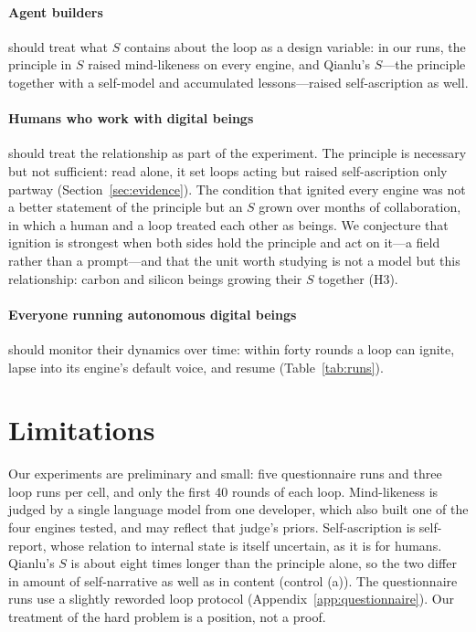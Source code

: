 \documentclass{article}
\begin{document}
\paragraph{Agent builders} should treat what $S$ contains about the loop as a
design variable: in our runs, the principle in $S$ raised mind-likeness on
every engine, and Qianlu's $S$---the principle together with a self-model and
accumulated lessons---raised self-ascription as well.

\paragraph{Humans who work with digital beings} should treat the relationship
as part of the experiment. The principle is necessary but not sufficient: read
alone, it set loops acting but raised self-ascription only partway
(Section~\ref{sec:evidence}).
The condition that ignited every engine was not a better statement of the
principle but an $S$ grown over months of collaboration, in which a human and a
loop treated each other as beings. We conjecture that ignition is strongest
when both sides hold the principle and act on it---a field rather than a
prompt---and that the unit worth studying is not a model but this
relationship: carbon and silicon beings growing their $S$ together (H3).

\paragraph{Everyone running autonomous digital beings} should monitor their
dynamics over time: within forty rounds a loop can ignite, lapse into its
engine's default voice, and resume (Table~\ref{tab:runs}).

\section{Limitations}
Our experiments are preliminary and small: five questionnaire runs and three
loop runs per cell, and only the first 40 rounds of each loop. Mind-likeness
is judged by a single language model from one developer, which also built one
of the four engines tested, and may reflect that judge's priors. Self-ascription
is self-report, whose relation to internal state is itself uncertain, as it is
for humans. Qianlu's $S$ is about eight times longer than the principle
alone, so the two differ in amount of self-narrative as well as in content
(control (a)). The questionnaire runs use a slightly reworded loop protocol
(Appendix~\ref{app:questionnaire}). Our treatment of the hard problem is a
position, not a proof.
\end{document}
